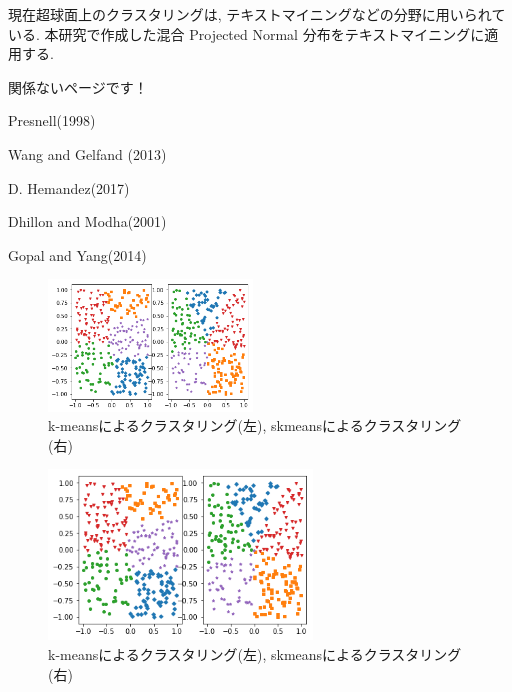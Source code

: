 \documentclass[a4j,11pt]{jarticle}
\makeatletter
\def\section{\@startsection{section}{1}{\z@}
   {0.8\Cvs \@plus.5\Cdp \@minus.2\Cdp}
   {0.2\Cvs \@plus.3\Cdp}
   {\normalfont \Large \bfseries}}
\makeatother
\begin{document}
現在超球面上のクラスタリングは, テキストマイニングなどの分野に用いられている. 本研究で作成した混合 Projected Normal 分布をテキストマイニングに適用する.

{} %






\newpage

関係ないページです！

Presnell(1998) \cite{PML}

Wang and Gelfand (2013) \cite{PN1}

D. Hemandez(2017) \cite{GPN}

Dhillon and Modha(2001) \cite{SKMcluster}

Gopal and Yang(2014) \cite{Gopal}

\vspace{-0.3cm}
\begin{figure}[H]
\begin{center}
\includegraphics[clip,height= 35mm]{data/kmeans+skmeans.png}
\end{center}
 \vspace{-0.9cm}
\caption{k-meansによるクラスタリング(左), skmeansによるクラスタリング(右)}
\label{skmeans}
\end{figure}

\begin{figure}
\vspace{-0.6cm}
\centering
\includegraphics[keepaspectratio,width=70mm]{data/kmeans+skmeans.png}
\vspace{-1cm}
\caption{k-meansによるクラスタリング(左), skmeansによるクラスタリング(右)}
\label{kmeans}
\end{figure}
\fi
\end{document}

